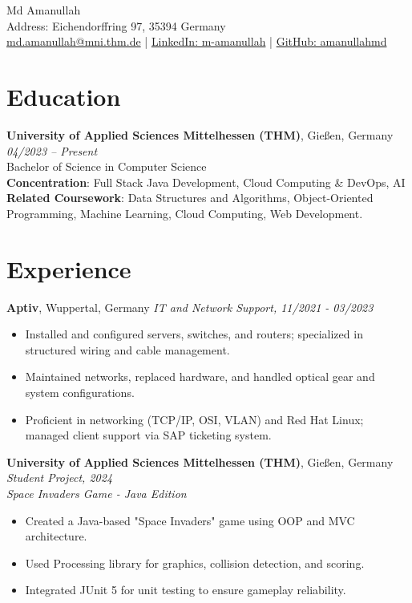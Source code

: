 \documentclass[10pt]{article}
\begin{document}
\begin{center}
    {\huge Md Amanullah} \\
    Address: Eichendorffring 97, 35394 Germany \\
    \href{mailto:md.amanullah@mni.thm.de}{md.amanullah@mni.thm.de} | \href{https://www.linkedin.com/in/m-amanullah/}{LinkedIn: m-amanullah} | \href{https://github.com/amanullahmd}{GitHub: amanullahmd}
\end{center}

\section*{Education}
\textbf{University of Applied Sciences Mittelhessen (THM)}, Gießen, Germany \hfill \textit{04/2023 -- Present} \\
Bachelor of Science in Computer Science \\
\textbf{Concentration}: Full Stack Java Development, Cloud Computing \& DevOps, AI \\
\textbf{Related Coursework}: Data Structures and Algorithms, Object-Oriented Programming, Machine Learning, Cloud Computing, Web Development.

\section*{Experience}

 \textbf{Aptiv}, Wuppertal, Germany \hfill \textit{IT and Network Support, 11/2021 - 03/2023} \\
 \begin{itemize}
    \item Installed and configured servers, switches, and routers; specialized in structured wiring and cable management.
    \item Maintained networks, replaced hardware, and handled optical gear and system configurations.
    \item Proficient in networking (TCP/IP, OSI, VLAN) and Red Hat Linux; managed client support via SAP ticketing system.\\
\end{itemize}

\textbf{University of Applied Sciences Mittelhessen (THM)}, Gießen, Germany \hfill \textit{Student Project, 2024} \\
\textit{Space Invaders Game - Java Edition} \\
\begin{itemize}
    \item Created a Java-based "Space Invaders" game using OOP and MVC architecture.
    \item Used Processing library for graphics, collision detection, and scoring.
    \item Integrated JUnit 5 for unit testing to ensure gameplay reliability.
\end{itemize}
\end{document}
